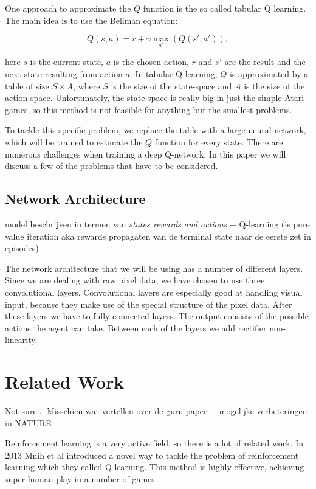 \documentclass{article}
\begin{document}
One approach to approximate the $Q$ function is the so called tabular Q learning. The main idea is to use the Bellman equation: 

\[
	Q(s,a) = r + \gamma \max_{a'} (Q(s',a')),
\]

here $s$ is the current state, $a$ is the chosen action, $r$ and $s'$ are the result and the next state resulting from action $a$. In tabular Q-learning, $Q$ is approximated by a table of size $S \times A$, where $S$ is the size of the state-space and $A$ is the size of the action space. Unfortunately, the state-space is really big in just the simple Atari games, so this method is not feasible for anything but the smallest problems.

To tackle this specific problem, we replace the table with a large neural network, which will be trained to estimate the $Q$ function for every state. There are numerous challenges when training a deep Q-network. In this paper we will discuss a few of the problems that have to be considered.

\subsection{Network Architecture}

model beschrijven in termen van \emph{states rewards and actions} + Q-learning (is pure value iteration aka rewards propagaten van de terminal state naar de eerste zet in episodes)

The network architecture that we will be using has a number of different layers. Since we are dealing with raw pixel data, we have chosen to use three %
convolutional layers. Convolutional layers are especially good at handling visual input, because they make use of the special structure of the pixel data. After these layers we have to fully connected layers. The output consists of the possible actions the agent can take. Between each of the layers we add rectifier non-linearity.




\section{Related Work}

Not sure... Misschien wat vertellen over de guru paper \cite{mnih2013playing} + mogelijke verbeteringen in NATURE \cite{mnih2015human}

Reinforcement learning is a very active field, so there is a lot of related work. In 2013 Mnih et al introduced a novel way to tackle the problem of reinforcement learning which they called Q-learning. This method is highly effective, achieving super human play in a number of games.
\end{document}
